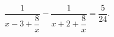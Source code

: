 \begin{ex}[type=equation]
	\begin{condition}
		$\dfrac{1}{x - 3 + \dfrac{8}{x}} - \dfrac{1}{x + 2 + \dfrac{8}{x}} = \dfrac{5}{24}.$
	\end{condition}
\end{ex}